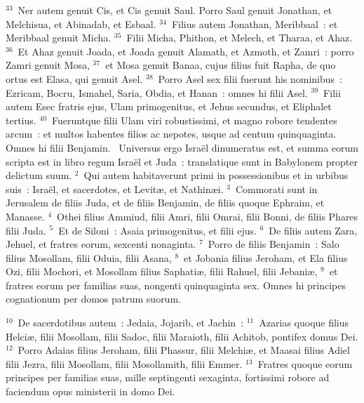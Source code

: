 ${}^{33}$~Ner autem genuit Cis, et Cis genuit Saul. Porro Saul genuit Jonathan, et Melchisua, et Abinadab, et Esbaal.
${}^{34}$~Filius autem Jonathan, Meribbaal~: et Meribbaal genuit Micha.
${}^{35}$~Filii Micha, Phithon, et Melech, et Tharaa, et Ahaz.
${}^{36}$~Et Ahaz genuit Joada, et Joada genuit Alamath, et Azmoth, et Zamri~: porro Zamri genuit Mosa,
${}^{37}$~et Mosa genuit Banaa, cujus filius fuit Rapha, de quo ortus est Elasa, qui genuit Asel.
${}^{38}$~Porro Asel sex filii fuerunt his nominibus~: Ezricam, Bocru, Ismahel, Saria, Obdia, et Hanan~: omnes hi filii Asel.
${}^{39}$~Filii autem Esec fratris ejus, Ulam primogenitus, et Jehus secundus, et Eliphalet tertius.
${}^{40}$~Fueruntque filii Ulam viri robustissimi, et magno robore tendentes arcum~: et multos habentes filios ac nepotes, usque ad centum quinquaginta. Omnes hi filii Benjamin.
~\lettrine[lines=10,image=true,loversize=0.05,lraise=-0.03]{U}{}niversus ergo Isra\"el dinumeratus est, et summa eorum scripta est in libro regum Isra\"el et Juda~: translatique sunt in Babylonem propter delictum suum.
${}^{2}$~Qui autem habitaverunt primi in possessionibus et in urbibus suis~: Isra\"el, et sacerdotes, et Levit\ae , et Nathin\ae i.
${}^{3}$~Commorati sunt in Jerusalem de filiis Juda, et de filiis Benjamin, de filiis quoque Ephraim, et Manasse.
${}^{4}$~Othei filius Ammiud, filii Amri, filii Omrai, filii Bonni, de filiis Phares filii Juda.
${}^{5}$~Et de Siloni~: Asaia primogenitus, et filii ejus.
${}^{6}$~De filiis autem Zara, Jehuel, et fratres eorum, sexcenti nonaginta.
${}^{7}$~Porro de filiis Benjamin~: Salo filius Mosollam, filii Oduia, filii Asana,
${}^{8}$~et Jobania filius Jeroham, et Ela filius Ozi, filii Mochori, et Mosollam filius Saphati\ae , filii Rahuel, filii Jebani\ae ,
${}^{9}$~et fratres eorum per familias suas, nongenti quinquaginta sex. Omnes hi principes cognationum per domos patrum suorum.


${}^{10}$~De sacerdotibus autem~: Jedaia, Jojarib, et Jachin~:
${}^{11}$~Azarias quoque filius Helci\ae , filii Mosollam, filii Sadoc, filii Maraioth, filii Achitob, pontifex domus Dei.
${}^{12}$~Porro Adaias filius Jeroham, filii Phassur, filii Melchi\ae , et Maasai filius Adiel filii Jezra, filii Mosollam, filii Mosollamith, filii Emmer.
${}^{13}$~Fratres quoque eorum principes per familias suas, mille septingenti sexaginta, fortissimi robore ad faciendum opus ministerii in domo Dei.


